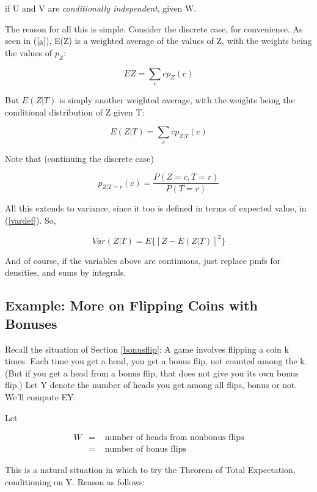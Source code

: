 \documentclass[11pt]{article}
\begin{document}
if U and V are {\it conditionally independent}, given W.

The reason for all this is simple.  Consider the discrete case, for
convenience.  As seen in (\ref{a}), E(Z) is a weighted average of the
values of Z, with the weights being the values of $p_Z$:

\begin{equation}
EZ = \sum_c c p_Z(c)
\end{equation}

But $E(Z | T)$ is simply another weighted average, with the weights
being the conditional distribution of Z given T:

\begin{equation}
E(Z | T) = \sum_c c p_{Z|T}(c)
\end{equation}

Note that (continuing the discrete case)

\begin{equation}
p_{Z|T=r}(c) =
\frac{P(Z = c, T = r)}{P(T = r)}
\end{equation}

All this extends to variance, since it too is defined in terms of
expected value, in (\ref{vardef}).  So,

\begin{equation}
Var(Z | T) = E\{[Z - E(Z|T)]^2\}
\end{equation}

And of course, if the variables above are continuous, just replace pmfs
for densities, and sums by integrals.

\subsection{Example:  More on Flipping Coins with Bonuses}

Recall the situation of Section \ref{bonusflip}:  A game involves
flipping a coin k times.  Each time you get a head, you get a bonus
flip, not counted among the k.  (But if you get a head from a bonus
flip, that does not give you its own bonus flip.) Let Y denote the
number of heads you get among all flips, bonus or not.   We'll compute
EY.

Let

\begin{eqnarray}
W &=& \textrm{ number of heads from nonbonus flips} \\ 
  &=& \textrm{ number of bonus flips} 
\end{eqnarray}

This is a natural situation in which to try the Theorem of Total
Expectation, conditioning on Y.  Reason as follows:
\end{document}
